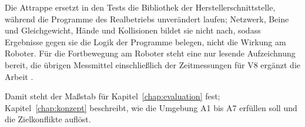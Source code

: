 Die Attrappe ersetzt in den Tests die Bibliothek der Herstellerschnittstelle, während die Programme des Realbetriebs unverändert laufen; Netzwerk, Beine und Gleichgewicht, Hände und Kollisionen bildet sie nicht nach, sodass Ergebnisse gegen sie die Logik der Programme belegen, nicht die Wirkung am Roboter.
Für die Fortbewegung am Roboter steht eine nur lesende Aufzeichnung bereit, die übrigen Messmittel einschließlich der Zeitmessungen für V8 ergänzt die Arbeit .

Damit steht der Maßstab für Kapitel~\ref{chap:evaluation} fest; Kapitel~\ref{chap:konzept} beschreibt, wie die Umgebung A1 bis A7 erfüllen soll und die Zielkonflikte auflöst.
